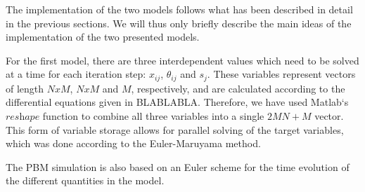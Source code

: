 The implementation of the two models follows what has been described in detail in the previous sections. We will thus only briefly describe the main ideas of the implementation of the two presented models.

For the first model, there are three interdependent values which need to be solved at a time for each iteration step: $x_{ij}$, $\theta_{ij}$ and $s_{j}$. These variables represent vectors of length $NxM$, $NxM$ and $M$, respectively, and are calculated according to the differential equations given in BLABLABLA. Therefore, we have  used Matlab‘s $\textit{reshape}$ function to combine all three variables into a single $2MN+M$ vector. This form of variable storage allows for parallel solving of the target variables, which was done according to the Euler-Maruyama method.

The PBM simulation is also based on an Euler scheme for the time evolution of the different quantities in the model. 
